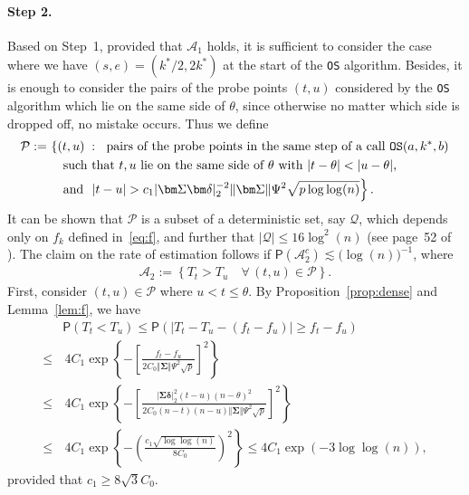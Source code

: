 \documentclass[11pt, a4paper]{article}
\newcommand{\mc}{\mathcal}
\renewcommand{\l}{\left}
\renewcommand{\r}{\right}
\newcommand{\cp}{\theta}
\newcommand{\p}{\mathsf{P}}
\newcommand{\nn}{\nonumber}
\theoremstyle{definition}
\theoremstyle{definition}
\theoremstyle{definition}
\theoremstyle{definition}
\theoremstyle{definition}
\theoremstyle{remark}
\theoremstyle{definition}
\theoremstyle{definition}
\theoremstyle{definition}
\begin{document}
\paragraph{Step 2.}
Based on Step~1, provided that $\mc A_1$ holds, it is sufficient to consider the case where we have $(s, e) = (k^*/2, 2k^*)$ at the start of the \texttt{OS} algorithm.
Besides, it is enough to consider the pairs of the probe points $(t, u)$ considered by the \texttt{OS} algorithm which lie on the same side of $\cp$, since otherwise no matter which side is dropped off, no mistake occurs.
Thus we define
\begin{align*}
\mc P :=& \, \l\{(t, u) \;:\; \text{ pairs of the probe points in the same step of a call \texttt{OS}$(a, k^*, b)$} \r. 
\\
& \quad \l. \text{such that $t, u$ lie on the same side of $\cp$ with $\vert t - \cp \vert < \vert u - \cp \vert$}, \r. 
\\
& \quad \l. \text{and \ } \vert t - u \vert > c_1 \vert \bm\Sigma \bm\delta \vert_2^{-2} \Vert \bm\Sigma \Vert \Psi^2 \sqrt{p\log\log(n)} \r\}.
\end{align*}
It can be shown that $\mc P$ is a subset of a deterministic set, say $\mc Q$, which depends only on $f_k$ defined in~\eqref{eq:f}, and further that $\vert \mc Q \vert \le 16\log^2(n)$ (see page~52 of \citealp{kovacs2024optimistic}).
The claim on the rate of estimation follows if $\p(\mc A_2^c) \lesssim \bigl(\log(n)\bigr)^{-1}$, where
\begin{align*}
\mc A_2 := \l\{ T_t > T_u \quad \forall \, (t, u) \in \mc P \r\}.
\end{align*}
First, consider $(t, u) \in \mc P$ where $u < t \le \cp$.
By Proposition~\ref{prop:dense} and Lemma~\ref{lem:f}, we have
\begin{align}
& \p\l( T_t <  T_u \r)
\le \p\l( \l\vert T_t - T_u - (f_t - f_u) \r\vert \ge f_t- f_u \r)
\nn \\
\le & \, 4 C_1 \exp\l\{ - \l[ \frac{ f_t - f_u}{2 C_0 \Vert \bm\Sigma \Vert \Psi^2 \sqrt{p}} \r]^2 \r\}
\nn \\
\le & \, 4 C_1 \exp\l\{ - \l[ 
\frac{\vert \bm\Sigma \bm\delta \vert_2^2 (t - u) (n - \cp)^2}{2 C_0 (n - t)(n - u) \Vert \bm\Sigma \Vert \Psi^2 \sqrt{p}}
\r]^2 \r\} %
\nn \\
\le & \, 4 C_1 \exp\l\{ - \l( \frac{c_1 \sqrt{\log\log(n)}}{8 C_0} \r)^2 \r\} 
\le 4 C_1 \exp( - 3 \log\log(n)),
\label{eq:thm:qcscan:three}
\end{align}
provided that $c_1 \ge 8 \sqrt{3} C_0$.
\end{document}

